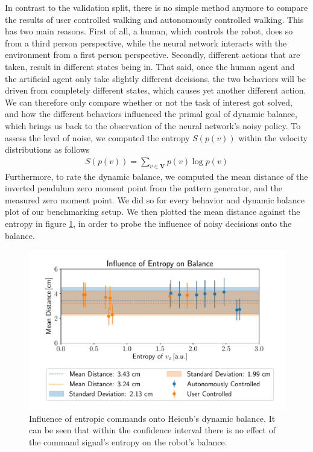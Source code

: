 In contrast to the validation split, there is no simple method anymore to compare the results of user controlled walking and autonomously controlled walking. This has two main reasons. First of all, a human, which controls the robot, does so from a third person perspective, while the neural network interacts with the environment from a first person perspective. Secondly, different actions that are taken, result in different states being in. That said, once the human agent and the artificial agent only take slightly different decisions, the two behaviors will be driven from completely different states, which causes yet another different action. We can therefore only compare whether or not the task of interest got solved, and how the different behaviors influenced the primal goal of dynamic balance, which brings us back to the observation of the neural network's noisy policy. To assess the level of noise, we computed the entropy $S(p(v))$ within the velocity distributions as follows
\begin{align}
	S(p(v)) = \sum_{v\in \bm{V}}p(v)\log p(v)
\end{align}
Furthermore, to rate the dynamic balance, we computed the mean distance of the inverted pendulum zero moment point from the pattern generator, and the measured zero moment point. We did so for every behavior and dynamic balance plot of our benchmarking setup. We then plotted the mean distance against the entropy in figure \ref{fig::424_entropy_balance}, in order to probe the influence of noisy decisions onto the balance.
\begin{figure}[h!]
	\centering
	\includegraphics[scale=.5]{chapters/04_experiments/02_autonomous_walking/entropy_against_balance.pdf}
	\caption{Influence of entropic commands onto Heicub's dynamic balance. It can be seen that within the confidence interval there is no effect of the command signal's entropy on the robot's balance.}
	\label{fig::424_entropy_balance}
\end{figure}
